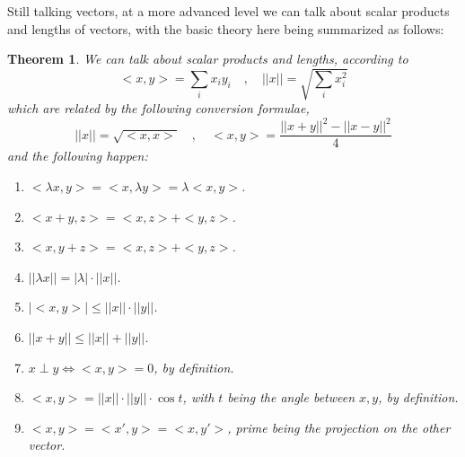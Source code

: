\documentclass[12pt]{amsbook}
\newtheorem{theorem}{Theorem}[chapter]
\begin{document}
Still talking vectors, at a more advanced level we can talk about scalar products and lengths of vectors, with the basic theory here being summarized as follows:

\begin{theorem}
We can talk about scalar products and lengths, according to
$$<x,y>=\sum_ix_iy_i\quad,\quad ||x||=\sqrt{\sum_ix_i^2}$$
which are related by the following conversion formulae,
$$||x||=\sqrt{<x,x>}\quad,\quad<x,y>=\frac{||x+y||^2-||x-y||^2}{4}$$
and the following happen:
\begin{enumerate}
\item $<\lambda x,y>=<x,\lambda y>=\lambda<x,y>$.

\item $<x+y,z>=<x,z>+<y,z>$.

\item $<x,y+z>=<x,z>+<y,z>$. 

\item $||\lambda x||=|\lambda|\cdot||x||$.

\item $|<x,y>|\leq||x||\cdot||y||$.

\item $||x+y||\leq||x||+||y||$.

\item $x\perp y\iff<x,y>=0$, by definition.

\item $<x,y>=||x||\cdot||y||\cdot\cos t$, with $t$ being the angle between $x,y$, by definition.

\item $<x,y>=<x',y>=<x,y'>$, prime being the projection on the other vector.
\end{enumerate}
\end{theorem}
\end{document}
